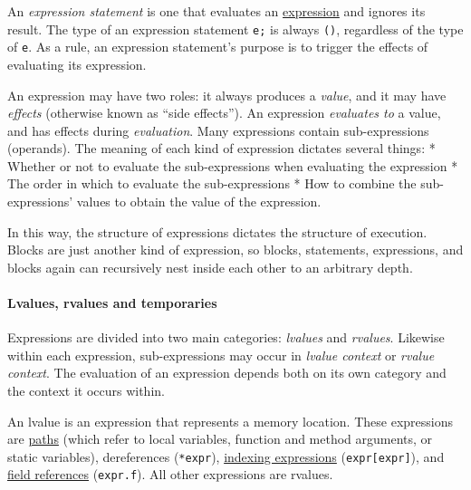 \documentclass[]{article}
\begin{document}

An \emph{expression statement} is one that evaluates an
\hyperref[expressions]{expression} and ignores its result. The type of
an expression statement \texttt{e;} is always \texttt{()}, regardless of
the type of \texttt{e}. As a rule, an expression statement's purpose is
to trigger the effects of evaluating its expression.


An expression may have two roles: it always produces a \emph{value}, and
it may have \emph{effects} (otherwise known as ``side effects''). An
expression \emph{evaluates to} a value, and has effects during
\emph{evaluation}. Many expressions contain sub-expressions (operands).
The meaning of each kind of expression dictates several things: *
Whether or not to evaluate the sub-expressions when evaluating the
expression * The order in which to evaluate the sub-expressions * How to
combine the sub-expressions' values to obtain the value of the
expression.

In this way, the structure of expressions dictates the structure of
execution. Blocks are just another kind of expression, so blocks,
statements, expressions, and blocks again can recursively nest inside
each other to an arbitrary depth.

\paragraph{Lvalues, rvalues and
temporaries}\label{lvalues-rvalues-and-temporaries}

Expressions are divided into two main categories: \emph{lvalues} and
\emph{rvalues}. Likewise within each expression, sub-expressions may
occur in \emph{lvalue context} or \emph{rvalue context}. The evaluation
of an expression depends both on its own category and the context it
occurs within.

An lvalue is an expression that represents a memory location. These
expressions are \hyperref[path-expressions]{paths} (which refer to local
variables, function and method arguments, or static variables),
dereferences (\texttt{*expr}), \hyperref[index-expressions]{indexing
expressions} (\texttt{expr{[}expr{]}}), and
\hyperref[field-expressions]{field references} (\texttt{expr.f}). All
other expressions are rvalues.
\end{document}
